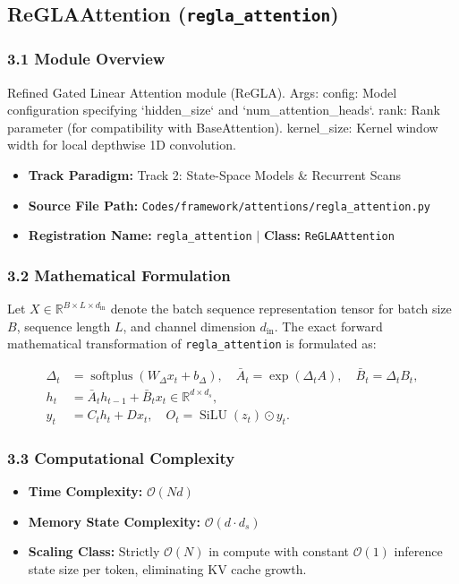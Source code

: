 \subsection{ReGLAAttention (\texttt{regla\_attention})}
\label{sec:app_module_regla\_attention}

\subsubsection*{3.1 Module Overview}
Refined Gated Linear Attention module (ReGLA).  Args:     config: Model configuration specifying `hidden\_size` and `num\_attention\_heads`.     rank: Rank parameter (for compatibility with BaseAttention).     kernel\_size: Kernel window width for local depthwise 1D convolution.
\begin{itemize}
    \item \textbf{Track Paradigm:} Track 2: State-Space Models & Recurrent Scans
    \item \textbf{Source File Path:} \texttt{Codes/framework/attentions/regla\_attention.py}
    \item \textbf{Registration Name:} \texttt{regla\_attention} $\mid$ \textbf{Class:} \texttt{ReGLAAttention}
\end{itemize}

\subsubsection*{3.2 Mathematical Formulation}
Let $X \in \mathbb{R}^{B \times L \times d_{\text{in}}}$ denote the batch sequence representation tensor for batch size $B$, sequence length $L$, and channel dimension $d_{\text{in}}$. The exact forward mathematical transformation of \texttt{regla\_attention} is formulated as:

\begin{align}
\Delta_t &= \operatorname{softplus}(W_\Delta x_t + b_\Delta), \quad \bar{A}_t = \exp(\Delta_t A), \quad \bar{B}_t = \Delta_t B_t, \\
h_t &= \bar{A}_t h_{t-1} + \bar{B}_t x_t \in \mathbb{R}^{d \times d_s}, \\
y_t &= C_t h_t + D x_t, \quad O_t = \operatorname{SiLU}(z_t) \odot y_t.
\end{align}


\subsubsection*{3.3 Computational Complexity}
\begin{itemize}
    \item \textbf{Time Complexity:} $\mathcal{O}(N d)$
    \item \textbf{Memory State Complexity:} $\mathcal{O}(d \cdot d_s)$
    \item \textbf{Scaling Class:} Strictly $\mathcal{O}(N)$ in compute with constant $\mathcal{O}(1)$ inference state size per token, eliminating KV cache growth.
\end{itemize}

